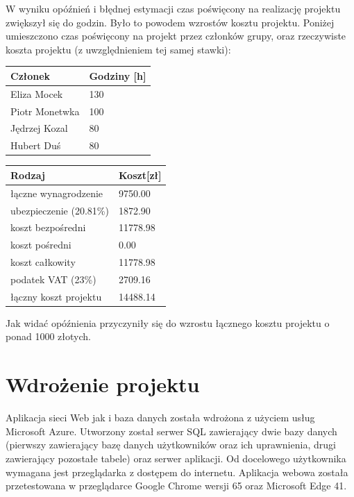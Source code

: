 \documentclass{article}
\begin{document}
W wyniku opóźnień i błędnej estymacji czas poświęcony na realizację projektu zwiększył się do  godzin. Było to powodem wzrostów kosztu projektu. Poniżej umieszczono czas poświęcony na projekt przez członków grupy, oraz rzeczywiste koszta projektu (z uwzględnieniem tej samej stawki): \\

\begin{center}
	\begin{tabular}{|p{4cm}|l|}
		\hline
		Członek & Godziny [h] \\\hline
		Eliza Mocek & 130 \\
		Piotr Monetwka & 100 \\
		Jędrzej Kozal & 80 \\
		Hubert Duś & 80 \\\hline
\end{tabular}
\end{center}
\newpage
\begin{center}
	\begin{tabular}{|p{4cm}|l|}
		\hline
		Rodzaj & Koszt[zł] \\\hline
		łączne wynagrodzenie & 9750.00 \\
		ubezpieczenie (20.81\%) & 1872.90\\
		koszt bezpośredni & 11778.98 \\
		koszt pośredni & 0.00 \\
		koszt całkowity & 11778.98 \\
		podatek VAT (23\%) & 2709.16 \\
		łączny koszt projektu & 14488.14 \\\hline
\end{tabular}
\end{center}


Jak widać opóźnienia przyczyniły się do wzrostu łącznego kosztu projektu o ponad 1000 złotych. 

\newpage

\section{Wdrożenie projektu}
Aplikacja sieci Web jak i baza danych została wdrożona z użyciem usług Microsoft Azure. Utworzony został serwer SQL zawierający dwie bazy danych (pierwszy zawierający bazę danych użytkowników oraz ich uprawnienia, drugi zawierający pozostałe tabele) oraz serwer aplikacji. Od docelowego użytkownika wymagana jest przeglądarka z dostępem do internetu. Aplikacja webowa została przetestowana w przeglądarce Google Chrome wersji 65 oraz Microsoft Edge 41.
\end{document}
